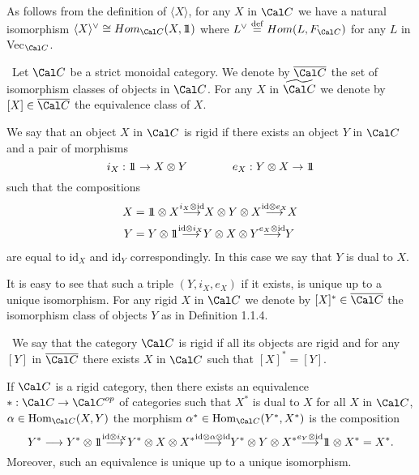 As follows from the definition of $\langle X\rangle$, for any $X$ in
${\Cal C}$  we have a natural isomorphism
$\langle X\rangle^\vee \cong Hom_{\Cal C}(X,\ident)$  where
$L^\vee\ {\buildrel{\text{def}}\over =}\ Hom(L,F_{\Cal C})$  for any $L$ in
Vec$_{\Cal C}$.

\ Let  ${\Cal C}$
be a strict monoidal category.  We denote by  $\overline{\Cal C}$  the set of
isomorphism classes of objects in  ${\Cal C}$.  For any  $X$  in
$\widetilde{\Cal C}$  we denote by  $[X] \in \overline{\Cal C}$  the
equivalence
class of $X$.

    We say that an object
$X$ in ${\Cal C}$ is rigid if there exists an object $Y$ in
${\Cal C}$ and a pair of morphisms
$$
i_X: 1\!\!1 \to X \otimes Y \qquad\qquad  e_X: Y \otimes X \to 1\!\!1
$$
such that the compositions
$$
\aligned
X &= \ident \otimes X {\buildrel {i_X \otimes \text{id}}\over\longrightarrow}
X \otimes Y \otimes X {\buildrel {\text{id}\otimes e_X}\over\longrightarrow}
X\\
Y &= Y \otimes \ident  {\buildrel {\text{id} \otimes i_X} \over\longrightarrow}
Y \otimes X \otimes Y {\buildrel {e_X\otimes \text{id}}\over\longrightarrow} Y
\endaligned
$$
are equal to $\text{id}_X$ and $\text{id}_Y$  correspondingly.  In this case we
say that $Y$ is dual to $X$.
\endproclaim


It is easy to see that such a triple $(Y, i_X, e_X)$  if it exists, is unique
up to a unique isomorphism.   For any rigid $X$ in ${\Cal C}$  we
denote by $[X]^* \in \overline{\Cal C}$  the isomorphism class of objects $Y$
as in Definition 1.1.4.

\ We say that the category ${\Cal C}$  is
rigid if
all its objects are rigid and for any $[Y]$ in $\overline{\Cal C}$  there
exists
$X$ in ${\Cal C}$  such that $[X]^* = [Y]$.
\endproclaim

If  ${\Cal C}$  is a rigid category, then there exists an equivalence
$*: {\Cal C} 	\to {\Cal C}^{op}$ of categories such that
$X^*$  is dual to $X$ for all $X$ in ${\Cal C}$,
$\alpha \in \text{Hom}_{{\Cal C}}(X,Y)$  the morphism
$\alpha^* \in \text{Hom}_{{\Cal C}}(Y^*,X^*)$  is the composition
$$
Y^*\longrightarrow Y^* \otimes \ident
{\buildrel {\text{id}\otimes i_X}\over\longrightarrow}
Y^* \otimes X \otimes X^*
{\buildrel {\text{id}\otimes\alpha\otimes \text{id}}\over\longrightarrow}
Y^* \otimes Y \otimes X^*
{\buildrel {e_Y \otimes \text{id}}\over\longrightarrow}
\ident \otimes X^* = X^*.
$$
Moreover, such an equivalence is unique up to a unique isomorphism.

